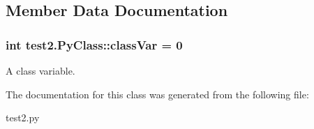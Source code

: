 \subsection{\-Member \-Data \-Documentation}
\hypertarget{classtest2_1_1PyClass_a830ce177c3b94007c61615fd1f33717d}{
\subsubsection[{class\-Var}]{\setlength{\rightskip}{0pt plus 5cm}int {\bf test2.\-Py\-Class\-::class\-Var} = 0}}\label{classtest2_1_1PyClass_a830ce177c3b94007c61615fd1f33717d}


\-A class variable. 



\-The documentation for this class was generated from the following file\-:\begin{DoxyCompactItemize}
\item 
test2.\-py\end{DoxyCompactItemize}
